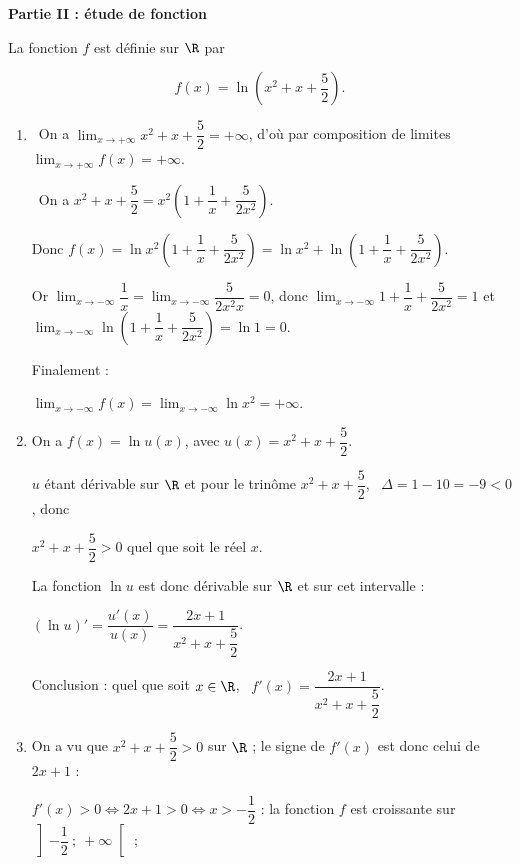 \bigskip

\textbf{Partie II : étude de fonction}

\medskip

La fonction $f$ est définie sur $\R$ par 

\[f(x) = \ln \left(x^2 + x + \dfrac{5}{2}\right).\]

\medskip

\begin{enumerate}
\item 
\starredbullet~On a $\displaystyle\lim_{x \to + \infty} x^2 + x + \dfrac{5}{2} = + \infty$, d'où par composition de limites $\displaystyle\lim_{x \to + \infty} f(x) = + \infty$.

\starredbullet~On a $x^2 + x + \dfrac{5}{2} = x^2\left(1 + \dfrac{1}{x} + \dfrac{5}{2x^2}\right)$.

Donc $f(x) = \ln x^2\left(1 + \dfrac{1}{x} + \dfrac{5}{2x^2}\right) = \ln x^2 + \ln \left(1 + \dfrac{1}{x} + \dfrac{5}{2x^2}\right)$.

Or $\displaystyle\lim_{x \to - \infty}\dfrac{1}{x} = \displaystyle\lim_{x \to - \infty}\dfrac{5}{2x^2x} = 0$, donc 
$\displaystyle\lim_{x \to - \infty}1 + \dfrac{1}{x} + \dfrac{5}{2x^2} = 1$ et $\displaystyle\lim_{x \to - \infty}\ln \left(1 + \dfrac{1}{x} + \dfrac{5}{2x^2}\right) = \ln 1 = 0$.

Finalement :

$\displaystyle\lim_{x \to - \infty}f(x) = \displaystyle\lim_{x \to - \infty}\ln x^2 = + \infty$.
\item 
On a $f(x) = \ln u(x)$, avec $u(x) = x^2 + x + \dfrac{5}{2}$.

$u$ étant dérivable sur $\R$ et pour le trinôme $x^2 + x + \dfrac{5}{2}$, \, $\Delta = 1 - 10 = - 9 < 0$, donc 

$x^2 + x + \dfrac{5}{2} > 0$ quel que soit le réel $x$.

La fonction $\ln u$ est donc dérivable sur $\R$ et sur cet intervalle :

$\left(\ln u \right)' = \dfrac{u'(x)}{u(x)} = \dfrac{2x + 1}{x^2 + x + \dfrac{5}{2}}$.

Conclusion : quel que soit $x \in \R$, \, $f'(x) = \dfrac{2x + 1}{x^2 + x + \dfrac{5}{2}}$.
\item 
On a vu que $x^2 + x + \dfrac{5}{2} > 0$ sur $\R$ ; le signe de $f'(x)$ est donc celui de $2x + 1$ :

\starredbullet $f'(x) > 0 \iff 2x + 1 > 0 \iff x > - \dfrac{1}{2}$ : la fonction $f$ est croissante sur $\left]- \dfrac{1}{2}~;~+ \infty\right[$ ;


\end{enumerate}
